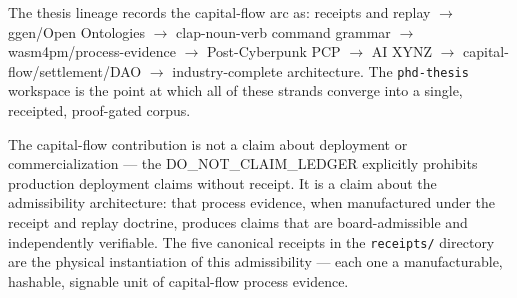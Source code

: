 The thesis lineage records the capital-flow arc as: receipts and replay $\to$ ggen/Open
Ontologies $\to$ clap-noun-verb command grammar $\to$ wasm4pm/process-evidence $\to$
Post-Cyberpunk PCP $\to$ AI XYNZ $\to$ capital-flow/settlement/DAO $\to$ industry-complete
architecture. The \texttt{phd-thesis} workspace is the point at which all of these strands
converge into a single, receipted, proof-gated corpus.

The capital-flow contribution is not a claim about deployment or commercialization --- the
DO\_NOT\_CLAIM\_LEDGER explicitly prohibits production deployment claims without receipt. It
is a claim about the admissibility architecture: that process evidence, when manufactured
under the receipt and replay doctrine, produces claims that are board-admissible and
independently verifiable. The five canonical receipts in the \texttt{receipts/} directory
are the physical instantiation of this admissibility --- each one a manufacturable, hashable,
signable unit of capital-flow process evidence.
